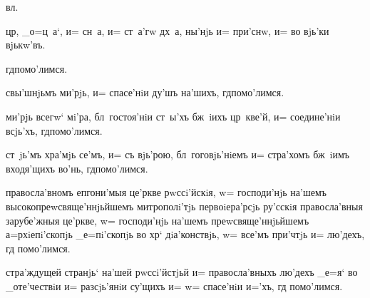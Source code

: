 



  вл.

  цр, _о=ц~а`, и= сн~а, и= 
ст~а'гw дх~а, ны'нjь и= при'снw, и= во вjь'ки вjькw'въ.


  гд помо'лимся.


 свы'шнjьмъ ми'рjь, и= спасе'нiи ду'шъ на'шихъ, 
гд помо'лимся.


 ми'рjь всегw` мi'ра, бл~гостоя'нiи ст~ы'хъ бж~iихъ 
цр~кве'й, и= соедине'нiи всjь'хъ, гд помо'лимся.


 ст~jь'мъ хра'мjь се'мъ, и= съ вjь'рою, 
бл~гоговjь'нiемъ и= стра'хомъ бж~iимъ входя'щихъ во'нь, 
гд помо'лимся.


 правосла'вномъ еп гони'мыя це'ркве 
рwссi'йскiя, w= господи'нjь на'шемъ вы\-со\-ко\-пре\-wсвя\-ще'н\-нjьй\-шемъ 
митро\-по\-лi'тjь  пер\-во\-iера'р\-сjь ру'с\-скiя 
\kinovarsimple{[}пра\-во\-сла'в\-ныя\kinovarsimple{]} за\-ру\-бе'ж\-ныя це'ркве, w= господи'нjь на'шемъ 
пре\-wсвя\-ще'н\-нjьй\-шемъ \kinovarsimple{[}а=р\-хi\-епi'с\-копjь  _е=пi'с\-копjь 
  \kinovarsimple{_о='б\-ласть],} во хр` 
дiа'конствjь, w= все'мъ при'чтjь и= лю'дехъ, гд 
помо'лимся.


 стра'ждущей странjь` на'шей рwссi'йстjьй и= 
правосла'вныхъ лю'дехъ _е=я` во _оте'чествiи и= 
разсjь'янiи су'щихъ и= w= спасе'нiи и='хъ, гд 
помо'лимся.


